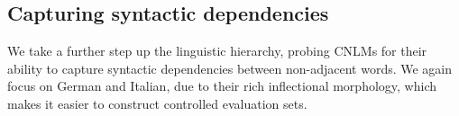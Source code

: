 \subsection{Capturing syntactic dependencies}
\label{sec:dependencies}



We take a further step up the linguistic hierarchy, probing CNLMs for their ability to capture syntactic dependencies between non-adjacent words. %
We again focus on German and Italian, due to their rich inflectional morphology, which makes it easier to construct controlled evaluation sets.%





